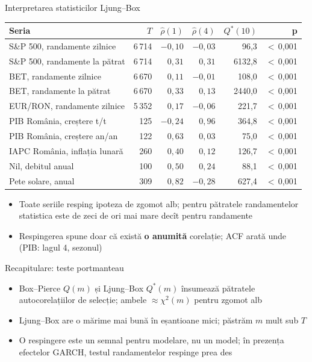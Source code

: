 \begin{frame}{Interpretarea statisticilor Ljung--Box}
\itemsize{\footnotesize}
\begin{center}
\scriptsize
\begin{tabular}{lrrrrr}
\toprule
Seria & $T$ & $\hat\rho(1)$ & $\hat\rho(4)$ & $Q^*(10)$ & p \\
\midrule
S\&P 500, randamente zilnice & 6\,714 & $\ensuremath{-}0{,}10$ & $\ensuremath{-}0{,}03$ & 96{,}3 & $<$\,0{,}001 \\
S\&P 500, randamente la pătrat & 6\,714 & $0{,}31$ & $0{,}31$ & 6132{,}8 & $<$\,0{,}001 \\
BET, randamente zilnice & 6\,670 & $0{,}11$ & $\ensuremath{-}0{,}01$ & 108{,}0 & $<$\,0{,}001 \\
BET, randamente la pătrat & 6\,670 & $0{,}33$ & $0{,}13$ & 2440{,}0 & $<$\,0{,}001 \\
EUR/RON, randamente zilnice & 5\,352 & $0{,}17$ & $\ensuremath{-}0{,}06$ & 221{,}7 & $<$\,0{,}001 \\
PIB România, creștere t/t & 125 & $\ensuremath{-}0{,}24$ & $0{,}96$ & 364{,}8 & $<$\,0{,}001 \\
PIB România, creștere an/an & 122 & $0{,}63$ & $0{,}03$ & 75{,}0 & $<$\,0{,}001 \\
IAPC România, inflația lunară & 260 & $0{,}40$ & $0{,}12$ & 126{,}7 & $<$\,0{,}001 \\
Nil, debitul anual & 100 & $0{,}50$ & $0{,}24$ & 88{,}1 & $<$\,0{,}001 \\
Pete solare, anual & 309 & $0{,}82$ & $\ensuremath{-}0{,}28$ & 627{,}4 & $<$\,0{,}001 \\
\bottomrule
\end{tabular}
\end{center}
\begin{itemize}
    \item Toate seriile resping ipoteza de zgomot alb; pentru pătratele randamentelor statistica este de zeci de ori mai mare decît pentru randamente
    \item Respingerea spune doar că există \textbf{o anumită} corelație; ACF arată unde (PIB: lagul 4, sezonul)
\end{itemize}
\end{frame}

\begin{frame}{Recapitulare: teste portmanteau}
\itemsize{\small}
\begin{itemize}
    \item Box--Pierce $Q(m)$ și Ljung--Box $Q^*(m)$ însumează pătratele autocorelațiilor de selecție; ambele $\approx \chi^2(m)$ pentru zgomot alb
    \item Ljung--Box are o mărime mai bună în eșantioane mici; păstrăm $m$ mult sub $T$
    \item O respingere este un semnal pentru modelare, nu un model; în prezența efectelor GARCH, testul randamentelor respinge prea des
\end{itemize}
\end{frame}



